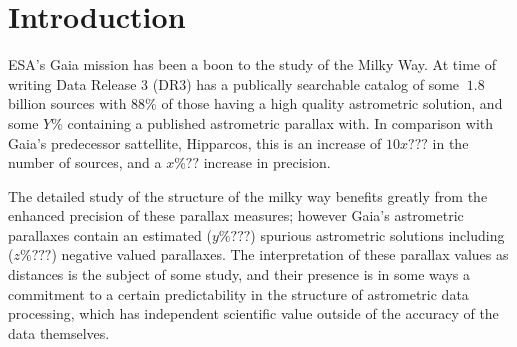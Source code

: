 \documentclass[twocolumn]{aastex631}
\begin{document}

\section{Introduction} \label{sec:intro}

ESA's Gaia mission has been a boon to the study of the Milky Way. At time of writing Data Release 3 (DR3) has a publically searchable catalog of some $~1.8$ billion sources with $88\%$ of those having a high quality astrometric solution, and some $Y\%$ containing a published astrometric parallax with. In comparison with Gaia's predecessor sattellite, Hipparcos, this is an increase of $10x???$ in the number of sources, and a $x\%??$ increase in precision.

The detailed study of the structure of the milky way benefits greatly from the enhanced precision of these parallax measures; however Gaia's astrometric parallaxes contain an estimated ($y\%???$) spurious astrometric solutions including ($z\%???$) negative valued parallaxes. The interpretation of these parallax values as distances is the subject of some study, and their presence is in some ways a commitment to a certain predictability in the structure of astrometric data processing, which has independent scientific value outside of the accuracy of the data themselves.
\end{document}
